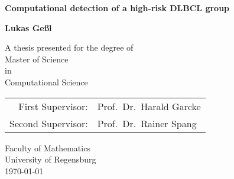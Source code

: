 \documentclass[10.5pt, a4paper, oneside]{report}
\begin{document}
    \begin{titlepage}
        \centering
        \vspace*{1cm}
        
        \huge
        \textsf{
        \textbf{Computational detection of a high-risk DLBCL group}
        }
        
        \vspace{1.5cm}
        
        \large
        \textbf{Lukas Geßl}
        
        \vfill
        
        \large
        A thesis presented for the degree of\\
        Master of Science\\
        in\\
        Computational Science
        
        \vspace{0.8cm}
        
        \begin{tabular}{rl}
            First Supervisor: & Prof.\ Dr.\ Harald Garcke \\
            Second Supervisor: & Prof.\ Dr.\ Rainer Spang \\
        \end{tabular}
        
        \vspace{0.8cm}
        
        Faculty of Mathematics\\
        University of Regensburg\\
        \vspace{0.8cm}
        \today
        
    \end{titlepage}
\end{document}
